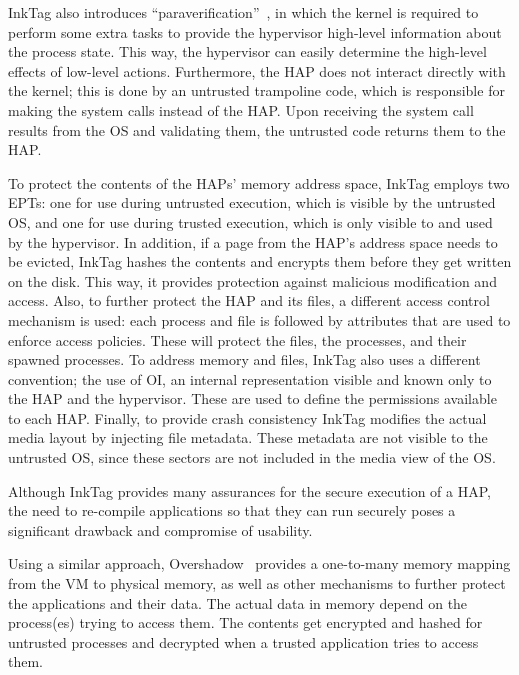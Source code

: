 \par InkTag also introduces ``paraverification''~\cite{hofmann2013inktag}, in which the kernel is required to perform some extra tasks to provide the hypervisor high-level information about the process state. This way, the hypervisor can easily determine the high-level effects of low-level actions. Furthermore, the \ac{HAP} does not interact directly with the kernel; this is done by an untrusted trampoline code, which is responsible for making the system calls instead of the \ac{HAP}. Upon receiving the system call results from the \ac{OS} and validating them, the untrusted code returns them to the \ac{HAP}.

\par To protect the contents of the \ac{HAP}s' memory address space, InkTag employs two \acp{EPT}: one for use during untrusted execution, which is visible by the untrusted \ac{OS}, and one for use during trusted execution, which is only visible to and used by the hypervisor. In addition, if a page from the \ac{HAP}'s address space needs to be evicted, InkTag hashes the contents and encrypts them before they get written on the disk. This way, it provides protection against malicious modification and access.
Also, to further protect the \ac{HAP} and its files, a different access control mechanism is used: each process and file is followed by attributes that are used to enforce access policies. These will protect the files, the processes, and their spawned processes. To address memory and files, InkTag also uses a different convention; the use of \ac{OI}, an internal representation visible and known only to the \ac{HAP} and the hypervisor. These are used to define the permissions available to each \ac{HAP}.
Finally, to provide crash consistency InkTag modifies the actual media layout by injecting file metadata. These metadata are not visible to the untrusted \ac{OS}, since these sectors are not included in the media view of the \ac{OS}. 

\par Although InkTag provides many assurances for the secure execution of a \ac{HAP}, the need to re-compile applications so that they can run securely poses a significant drawback and compromise of usability.

\par Using a similar approach, Overshadow~\cite{chen2008overshadow} provides a one-to-many memory mapping from the \ac{VM} to physical memory, as well as other mechanisms to further protect the applications and their data. The actual data in memory depend on the process(es) trying to access them. The contents get encrypted and hashed for untrusted processes and decrypted when a trusted application tries to access them. 

